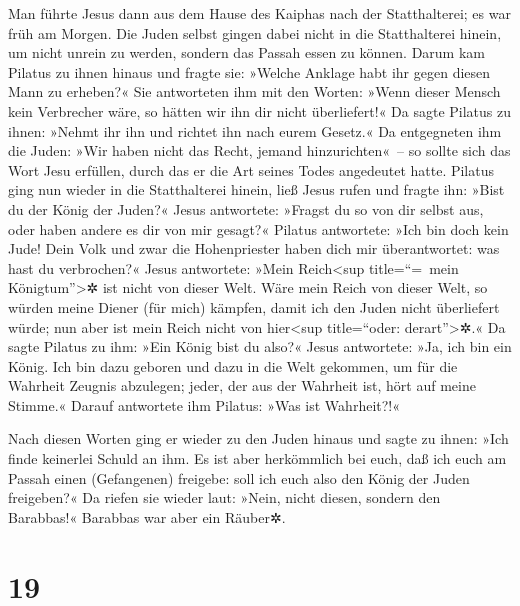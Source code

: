  Man führte Jesus dann aus dem Hause des Kaiphas nach der
Statthalterei; es war früh am Morgen. Die Juden selbst gingen dabei
nicht in die Statthalterei hinein, um nicht unrein zu werden, sondern
das Passah essen zu können.  Darum kam Pilatus zu ihnen
hinaus und fragte sie: »Welche Anklage habt ihr gegen diesen Mann zu
erheben?«  Sie antworteten ihm mit den Worten: »Wenn
dieser Mensch kein Verbrecher wäre, so hätten wir ihn dir nicht
überliefert!«  Da sagte Pilatus zu ihnen: »Nehmt ihr ihn
und richtet ihn nach eurem Gesetz.« Da entgegneten ihm die Juden: »Wir
haben nicht das Recht, jemand hinzurichten«~--  so sollte
sich das Wort Jesu erfüllen, durch das er die Art seines Todes
angedeutet hatte.  Pilatus ging nun wieder in die
Statthalterei hinein, ließ Jesus rufen und fragte ihn: »Bist du der
König der Juden?«  Jesus antwortete: »Fragst du so von
dir selbst aus, oder haben andere es dir von mir gesagt?«
 Pilatus antwortete: »Ich bin doch kein Jude! Dein Volk
und zwar die Hohenpriester haben dich mir überantwortet: was hast du
verbrochen?«  Jesus antwortete: »Mein Reich\textless sup
title=``=~mein Königtum''\textgreater✲ ist nicht von dieser Welt. Wäre
mein Reich von dieser Welt, so würden meine Diener (für mich) kämpfen,
damit ich den Juden nicht überliefert würde; nun aber ist mein Reich
nicht von hier\textless sup title=``oder: derart''\textgreater✲.«
 Da sagte Pilatus zu ihm: »Ein König bist du also?« Jesus
antwortete: »Ja, ich bin ein König. Ich bin dazu geboren und dazu in die
Welt gekommen, um für die Wahrheit Zeugnis abzulegen; jeder, der aus der
Wahrheit ist, hört auf meine Stimme.«  Darauf antwortete
ihm Pilatus: »Was ist Wahrheit?!«

Nach diesen Worten ging er wieder zu den Juden hinaus und sagte zu
ihnen: »Ich finde keinerlei Schuld an ihm.  Es ist aber
herkömmlich bei euch, daß ich euch am Passah einen (Gefangenen)
freigebe: soll ich euch also den König der Juden freigeben?«
 Da riefen sie wieder laut: »Nein, nicht diesen, sondern
den Barabbas!« Barabbas war aber ein Räuber✲.

\hypertarget{section-18}{%
\section{19}\label{section-18}}

